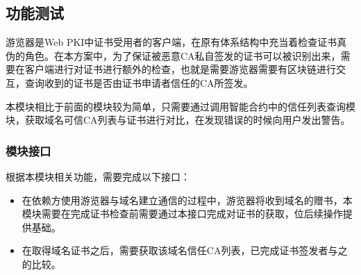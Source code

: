 


\subsection{功能测试}


游览器是Web PKI中证书受用者的客户端，在原有体系结构中充当着检查证书真伪的角色。在本方案中，为了保证被恶意CA私自签发的证书可以被识别出来，需要在客户端进行对证书进行额外的检查，也就是需要游览器需要有区块链进行交互，查询收到的证书是否由证书申请者信任的CA所签发。

本模块相比于前面的模块较为简单，只需要通过调用智能合约中的信任列表查询模块，获取域名可信CA列表与证书进行对比，在发现错误的时候向用户发出警告。

\subsubsection{模块接口}

根据本模块相关功能，需要完成以下接口：

\begin{itemize}
	\item 
	\noindent{}

	在依赖方使用游览器与域名建立通信的过程中，游览器将收到域名的赠书，本模块需要在完成证书检查前需要通过本接口完成对证书的获取，位后续操作提供基础。

	\item
	\noindent{}

	在取得域名证书之后，需要获取该域名信任CA列表，已完成证书签发者与之的比较。
	

\end{itemize}



